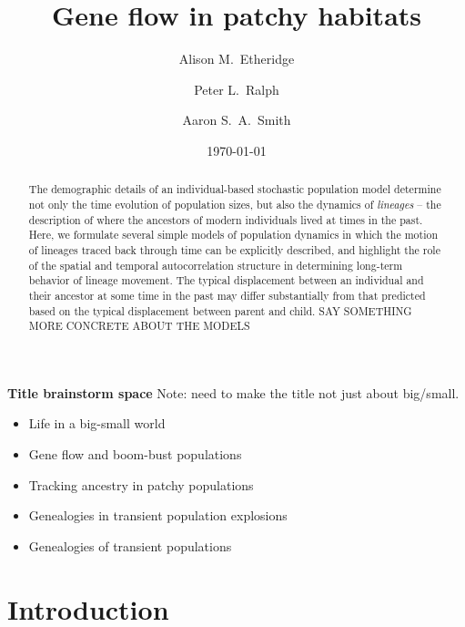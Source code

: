 \documentclass{article}
\title{Gene flow in patchy habitats}
\date{\normalsize\today}
\author[1]{Alison M.~Etheridge}
\author[2]{Peter L.~Ralph}
\author[1]{Aaron S.~A.~Smith}
\affil[1]{Department of Statistics, University of Oxford}
\affil[2]{Institute for Ecology and Evolution, Departments of Mathematics and Biology, University of Oregon}
\begin{document}
\maketitle

\textbf{Title brainstorm space}
Note: need to make the title not just about big/small.
\begin{itemize}
    \item Life in a big-small world
    \item Gene flow and boom-bust populations
    \item Tracking ancestry in patchy populations
    \item Genealogies in transient population explosions
    \item Genealogies of transient populations
\end{itemize}


\begin{abstract}
    The demographic details of an individual-based stochastic population model
    determine not only the time evolution of population sizes,
    but also the dynamics of \emph{lineages} --
    the description of where the ancestors of modern individuals lived at times in the past.
    Here, we formulate several simple models of population dynamics
    in which the motion of lineages traced back through time
    can be explicitly described,
    and highlight the role of the spatial and temporal autocorrelation structure
    in determining long-term behavior of lineage movement.
    The typical displacement between an individual
    and their ancestor at some time in the past
    may differ substantially from that predicted 
    based on the typical displacement between parent and child.
    SAY SOMETHING MORE CONCRETE ABOUT THE MODELS
\end{abstract}

\setcounter{tocdepth}{2}
\tableofcontents

\section*{Introduction}
\end{document}
